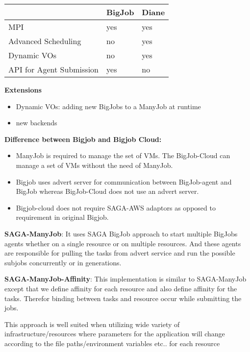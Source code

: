 \documentclass[]{article}
\begin{document}
\begin{tabular}{|l|l|l|}
\hline
 &BigJob &Diane\\
\hline
MPI &yes &yes\\
\hline
Advanced Scheduling &no &yes\\
\hline
Dynamic VOs &no &yes\\
\hline
API for Agent Submission &yes &no\\
\hline
\end{tabular}





\textbf{Extensions}
\begin{itemize}
    \item Dynamic VOs: adding new BigJobs to a ManyJob at runtime
    \item new backends
\end{itemize}


\textbf{Difference between Bigjob and Bigjob Cloud:} 

\begin{itemize}
	\item ManyJob is required to manage the set of VMs. The BigJob-Cloud can manage a set of VMs without the need of ManyJob.
	\item Bigjob uses advert server for communication between BigJob-agent and BigJob whereas BigJob-Cloud does not use an advert server.
	\item Bigjob-cloud does not require SAGA-AWS adaptors as opposed to requirement in original Bigjob. 
\end{itemize}	




\textbf{SAGA-ManyJob}:
It uses SAGA BigJob approach to start multiple BigJobs agents 
whether on a single resource or on multiple resources. And 
these agents are responsible for pulling the tasks from advert 
service and run the possible subjobs concurrently or in generations.



\textbf{SAGA-ManyJob-Affinity}:
This implementation is similar to SAGA-ManyJob except that we define affinity for each resource and also define affinity for the tasks. Therefor binding between tasks and resource occur while submitting the jobs.

This approach is well suited when utilizing wide variety of infrastructure/resources where parameters for the application will change according to the file paths/environment variables etc.. for each resource
\end{document}
